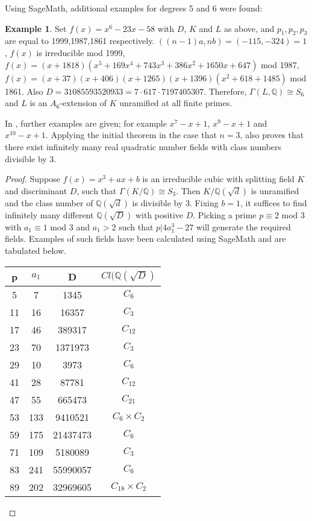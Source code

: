 \documentclass[12pt]{extarticle}
\newcommand{\Q}{\mathbb{Q}}
\newcommand{\<}{\langle}
\renewcommand{\>}{\rangle}
\theoremstyle{definition}
\newtheorem*{example}{Example}
\begin{document}
Using SageMath, additional examples for degrees 5 and 6 were found:
\begin{example}
Set $f(x)= x^6-23x-58$ with $D$, $K$ and $L$ as above, and $p_1,p_2,p_3$ are equal to 1999,1987,1861 respectively. $((n-1)a,nb) = (-115,-324)=1$, $f(x)$ is irreducible mod 1999, $f(x)=(x + 1818)(x^5 + 169x^4 + 743x^3+386x^2+1650x+647)$ mod 1987, $f(x)=(x + 37)(x + 406)(x + 1265)(x+1396)(x^2 + 618 + 1485)$ mod 1861. Also $D = 31085593520933 = 7 \cdot 617 \cdot 7197405307$. Therefore, $\Gamma(L,\Q) \cong S_6$ and $L$ is an $A_6$-extension of $K$ unramified at all finite primes.
\end{example}
In \cite{uchida1970}, further examples are given; for example $x^7-x+1$, $x^9-x+1$ and $x^{10}-x+1$. 
Applying the initial theorem in the case that $n=3$, \cite{uchida1970} also proves that there exist infinitely many real quadratic number fields with class numbers divisible by 3. 
\begin{proof}
Suppose $f(x) = x^3+ax+b$ is an irreducible cubic with splitting field $K$ and discriminant $D$, such that $\Gamma(K/\Q) \cong S_3$. Then $K/\Q(\sqrt{d})$ is unramified and the class number of $\Q(\sqrt{d})$ is divisible by 3.  Fixing $b=1$, it suffices to find infinitely many different $\Q(\sqrt{D})$ with positive $D$. Picking a prime $p \equiv 2$ mod 3 with $a_1 \equiv 1$ mod 3 and $a_1 > 2$ such that $p | 4a_1^3 - 27$ will generate the required fields. Examples of such fields have been calculated using SageMath and are tabulated below.
\begin{center}
 \begin{tabular}{| c | c | c | c |}
 \hline
p & $a_1$ & D & $Cl(\Q(\sqrt{D})$  \\ 
\hline
5 &  7 & 1345 & $C_{6}$ \\
\hline
11 &  16 & 16357 & $C_{3}$ \\
\hline
17 &  46 & 389317 & $C_{12}$ \\
\hline
23 &  70 & 1371973 & $C_{3}$ \\
\hline
29 &  10 & 3973 & $C_{6}$ \\
\hline
41 &  28 & 87781 & $C_{12}$ \\
\hline
47 &  55 & 665473 & $C_{21}$ \\
\hline
53 &  133 & 9410521 & $C_{6} \times C_{2}$ \\
\hline
59 &  175 & 21437473 & $C_{6}$ \\
\hline
71 &  109 & 5180089 & $C_{3}$ \\
\hline
83 &  241 & 55990057 & $C_{6}$ \\
\hline
89 &  202 & 32969605 & $C_{18} \times C_{2}$ \\
\hline
\end{tabular}
\end{center}
\end{proof}
\end{document}
